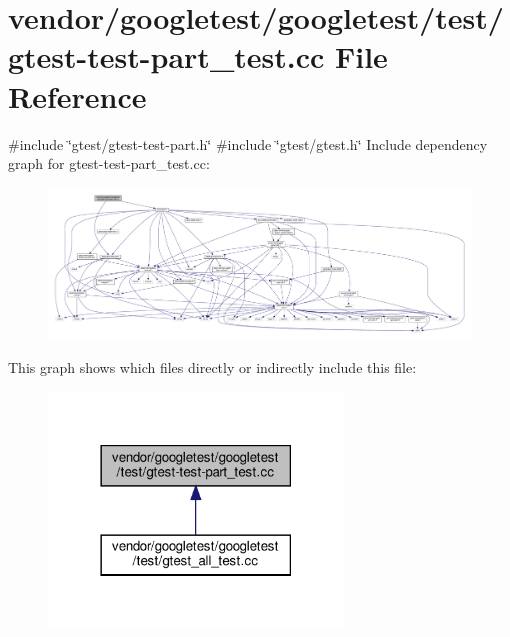 \hypertarget{gtest-test-part__test_8cc}{}\section{vendor/googletest/googletest/test/gtest-\/test-\/part\+\_\+test.cc File Reference}
\label{gtest-test-part__test_8cc}
{\ttfamily \#include \char`\"{}gtest/gtest-\/test-\/part.\+h\char`\"{}}\newline
{\ttfamily \#include \char`\"{}gtest/gtest.\+h\char`\"{}}\newline
Include dependency graph for gtest-\/test-\/part\+\_\+test.cc\+:
\nopagebreak
\begin{figure}[H]
\begin{center}
\leavevmode
\includegraphics[width=350pt]{gtest-test-part__test_8cc__incl}
\end{center}
\end{figure}
This graph shows which files directly or indirectly include this file\+:
\nopagebreak
\begin{figure}[H]
\begin{center}
\leavevmode
\includegraphics[width=222pt]{gtest-test-part__test_8cc__dep__incl}
\end{center}
\end{figure}
